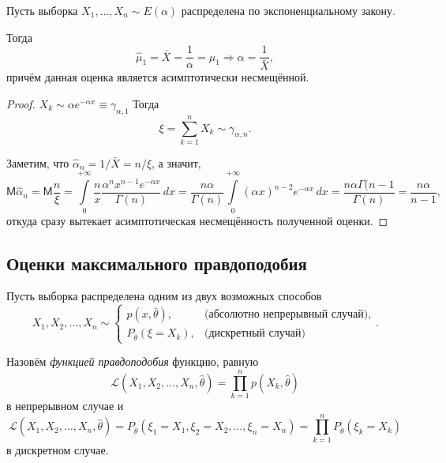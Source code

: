 \begin{ex}
  Пусть выборка $X_1, \dots, X_n \sim E(\alpha)$ распределена по
	экспоненциальному закону.

  Тогда
	\[
		\hat \mu_1 = \bar{X} = \frac{1}{\alpha} = \mu_1 \Rightarrow \alpha =
		\frac{1}{\bar{X}},
	\]
	причём данная оценка является асимптотически несмещённой. %
  \begin{proof}
    $X_k \sim \alpha e^{-\alpha x} \equiv \gamma_{\alpha, 1}$
		Тогда
		\[
			\xi = \sum_{k=1}^n X_k \sim \gamma_{\alpha, n}.
		\]

		Заметим, что $ \hat \alpha_n = 1/\bar X = n/\xi $, а значит,
		\[
			\mathsf M \hat \alpha_n = \mathsf M \frac{n}{\xi} = \int\limits_0^{+\infty} \frac{n}{x}
			\frac{\alpha^n x^{n-1} e^{-\alpha x}}{\Gamma(n)} \, dx = \frac{n
			\alpha}{\Gamma(n)} \int\limits_0^{+\infty} (\alpha x)^{n-2} e^{-\alpha x}
			\, dx = \frac{n\alpha \Gamma(n-1}{\Gamma(n)} = \frac{n\alpha}{n-1},
		\]
		откуда сразу вытекает асимптотическая несмещённость полученной оценки.

  \end{proof}
\end{ex}


\subsection{Оценки максимального правдоподобия}
Пусть выборка распределена одним из двух возможных способов
\[
	X_1, X_2, \dots, X_n \sim
  \begin{cases}
    p(x, \bar\theta), &\text{(абсолютно непрерывный случай)}, \\
    P_{\bar \theta}(\xi = X_k), &\text{(дискретный случай)} \end{cases}.
\]
\begin{definition}
	Назовём \emph{функцией правдоподобия} функцию, равную
	\[
		\mathscr{L} (X_1, X_2, \dots, X_n, \hat\theta) = 
		\prod_{k=1}^n p(X_k, \hat \theta)
	\]
в непрерывном случае и  
\[
	\mathscr{L} (X_1, X_2, \dots, X_n, \hat\theta) = P_{\bar\theta}(\xi_1 =
		X_1, \xi_2 = X_2, \dots, \xi_n = X_n) = \prod_{k=1}^n P_{\bar\theta}(\xi_k = X_k)
\]
в дискретном случае.
\end{definition}

